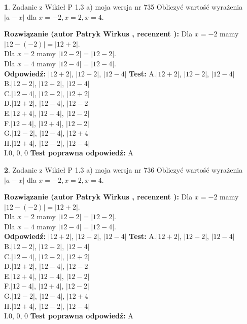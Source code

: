 \documentclass[12pt, a4paper]{article}
\theoremstyle{definition} %
\newtheorem{zad}{}
\newcommand{\zadStart}[1]{\begin{zad}#1\newline}
\newcommand{\zadStop}{\end{zad}}
\newcommand{\rozwStart}[2]{\noindent \textbf{Rozwiązanie (autor #1 , recenzent #2): }\newline}
\newcommand{\rozwStop}{\newline}
\newcommand{\odpStart}{\noindent \textbf{Odpowiedź:}\newline}
\newcommand{\odpStop}{\newline}
\newcommand{\testStart}{\noindent \textbf{Test:}\newline}
\newcommand{\testStop}{\newline}
\newcommand{\kluczStart}{\noindent \textbf{Test poprawna odpowiedź:}\newline}
\newcommand{\kluczStop}{\newline}
\begin{document}
\zadStart{Zadanie z Wikieł P 1.3 a) moja wersja nr 735}
Obliczyć wartość wyrażenia $|a - x|$ dla $x=-2,x=2,x=4$.
\zadStop
\rozwStart{Patryk Wirkus}{}
Dla $x = -2$ mamy $|12 - (-2)| = |12 + 2|$.\\
Dla $x = 2$ mamy $|12 - 2| = |12 - 2|$.\\
Dla $x = 4$ mamy $|12 - 4| = |12 - 4|$.\\
\rozwStop
\odpStart
$|12 + 2|$, $|12 - 2|$, $|12 - 4|$
\odpStop
\testStart
A.$|12 + 2|$, $|12 - 2|$, $|12 - 4|$\\
B.$|12 - 2|$, $|12 + 2|$, $|12 - 4|$\\
C.$|12 - 4|$, $|12 - 2|$, $|12 + 2|$\\
D.$|12 + 2|$, $|12 - 4|$, $|12 - 2|$\\
E.$|12 + 4|$, $|12 - 4|$, $|12 - 2|$\\
F.$|12 - 4|$, $|12 + 4|$, $|12 - 2|$\\
G.$|12 - 2|$, $|12 - 4|$, $|12 + 4|$\\
H.$|12 + 4|$, $|12 - 2|$, $|12 - 4|$\\
I.$0$, $0$, $0$
\testStop
\kluczStart
A
\kluczStop



\zadStart{Zadanie z Wikieł P 1.3 a) moja wersja nr 736}
Obliczyć wartość wyrażenia $|a - x|$ dla $x=-2,x=2,x=4$.
\zadStop
\rozwStart{Patryk Wirkus}{}
Dla $x = -2$ mamy $|12 - (-2)| = |12 + 2|$.\\
Dla $x = 2$ mamy $|12 - 2| = |12 - 2|$.\\
Dla $x = 4$ mamy $|12 - 4| = |12 - 4|$.\\
\rozwStop
\odpStart
$|12 + 2|$, $|12 - 2|$, $|12 - 4|$
\odpStop
\testStart
A.$|12 + 2|$, $|12 - 2|$, $|12 - 4|$\\
B.$|12 - 2|$, $|12 + 2|$, $|12 - 4|$\\
C.$|12 - 4|$, $|12 - 2|$, $|12 + 2|$\\
D.$|12 + 2|$, $|12 - 4|$, $|12 - 2|$\\
E.$|12 + 4|$, $|12 - 4|$, $|12 - 2|$\\
F.$|12 - 4|$, $|12 + 4|$, $|12 - 2|$\\
G.$|12 - 2|$, $|12 - 4|$, $|12 + 4|$\\
H.$|12 + 4|$, $|12 - 2|$, $|12 - 4|$\\
I.$0$, $0$, $0$
\testStop
\kluczStart
A
\kluczStop
\end{document}

